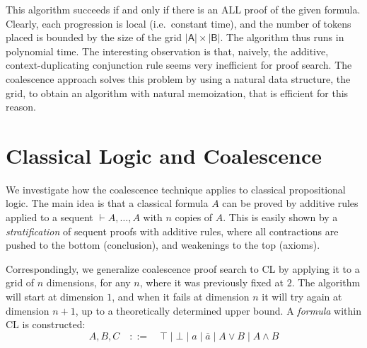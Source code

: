 \documentclass{article}
\newcommand\0{0}
\newcommand\1{1}
\newcommand\+{+}
\renewcommand\*{\times}
\newcommand\subs[1]{\mathsf{|#1|}}
\def\defeq{::=}
\newcommand\dual{\overline}
\begin{document}
        This algorithm succeeds if and only if there is an ALL proof of the given formula.
        Clearly, each progression is local (i.e.\ constant time), and the number of tokens placed is bounded by the size of the grid $\subs A\times\subs B$.
        The algorithm thus runs in polynomial time.
        The interesting observation is that, naively, the additive, context-duplicating conjunction rule seems very inefficient for proof search.
        The coalescence approach solves this problem by using a natural data structure, the grid, to obtain an algorithm with natural memoization, that is efficient for this reason.



    \section*{Classical Logic and Coalescence}
        We investigate how the coalescence technique applies to classical propositional logic.
        The main idea is that a classical formula $A$ can be proved by additive rules applied to a sequent $\vdash A,\dots,A$ with $n$ copies of $A$.
        This is easily shown by a \emph{stratification} of sequent proofs with additive rules, where all contractions are pushed to the bottom (conclusion), and weakenings to the top (axioms).

        Correspondingly, we generalize coalescence proof search to CL by applying it to a grid of $n$ dimensions, for any $n$, where it was previously fixed at $2$.
        The algorithm will start at dimension $1$, and when it fails at dimension $n$ it will try again at dimension $n+1$, up to a theoretically determined upper bound.
        A \emph{formula} within CL is constructed:
        \begin{equation*}
            A, B, C \quad \defeq \quad \top \mid \bot \mid a \mid \dual a \mid A \vee B \mid A \wedge B
        \end{equation*}
\end{document}
